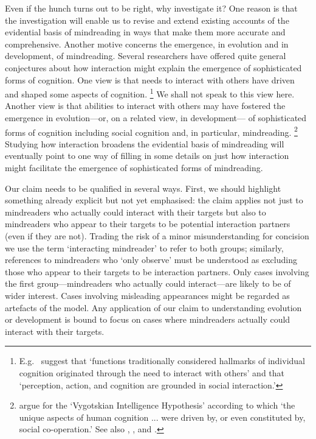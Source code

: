 \documentclass[14pt,a4paper]{extarticle}
\begin{document}
Even if the hunch turns out to be right, why investigate it?
One reason is that the investigation will enable us to revise and extend existing accounts of the evidential basis of mindreading  in ways that make them more accurate and comprehensive.
Another motive concerns the emergence, in evolution and in development, of mindreading.
Several researchers have offered quite general conjectures about how interaction might explain the emergence of sophisticated forms of cognition.
One view is that needs to interact with others have driven and shaped some aspects of cognition.%
\footnote{
E.g.\ \citet[p.\ 103]{Knoblich:2006bn} suggest that 
`functions traditionally considered hallmarks of individual cognition originated through the need to interact with others'
and that
`perception, action, and cognition are grounded in social interaction.'
}
We shall not speak to this view here.
Another view is that abilities to interact with others
may have fostered the emergence in evolution---or, on a related view, in development---%
of sophisticated forms of cognition including social cognition and, in particular, mindreading.%
\footnote{
\citet[p.\ 1]{Moll:2007gu}
argue for the `Vygotskian Intelligence Hypothesis' according to which `the unique aspects of human cognition ... were driven by, or even constituted by, social co-operation.'
See also
	\citet{Hughes:2004zj},
	\citet{Hughes:2006fu},
	\citet{Tomasello:2007gl} and
	\citet{tomasello:2008origins}.
}
Studying how interaction broadens the evidential basis of mindreading will eventually point to one way of filling in some details on just how interaction might facilitate the emergence of sophisticated forms of mindreading.

Our claim needs to be qualified in several ways.
First, we should highlight something already explicit but not yet emphasised:
the claim applies not just to 
 mindreaders who actually could interact with their targets
but also to
 mindreaders who appear to their targets to be potential interaction partners (even if they are not).
Trading the risk of a minor misunderstanding for concision we use the term `interacting mindreader' to refer to both groups;
similarly, references to mindreaders who `only observe' must be understood as excluding those who appear to their targets to be interaction partners.
Only cases involving the first group---mindreaders who actually could interact---are likely to be of wider interest.
Cases involving misleading appearances might be regarded as artefacts of the model.
Any application of our claim to understanding evolution or development is bound to focus on cases where mindreaders actually could interact with their targets.
\end{document}
